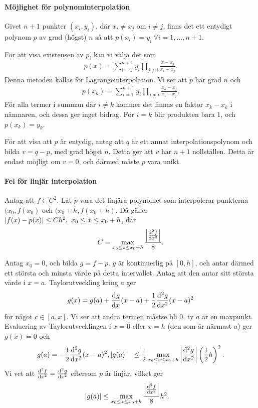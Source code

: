 \paragraph{Möjlighet för polynominterpolation}
Givet $n + 1$ punkter $(x_{i}, y_{i})$, där $x_{i}\neq x_{j}$ om $i\neq j$, finns det ett entydigt polynom $p$ av grad (högst) $n$ så att $p(x_{i}) = y_{i}\ \forall i= 1, \dots, n + 1$.

\proof
För att visa existensen av $p$, kan vi välja det som
\begin{align*}
	p(x) = \sum\limits_{i = 1}^{n + 1}y_{i}\prod\limits_{j\neq i}\frac{x - x_{j}}{x_{i} - x_{j}}.
\end{align*}
Denna metoden kallas för Lagrangeinterpolation. Vi ser att $p$ har grad $n$ och
\begin{align*}
	p(x_{k}) = \sum\limits_{i = 1}^{n + 1}y_{i}\prod\limits_{j\neq i}\frac{x_{k} - x_{j}}{x_{i} - x_{j}}.
\end{align*}
För alla termer i summan där $i\neq k$ kommer det finnas en faktor $x_{k} - x_{k}$ i nämnaren, och dessa ger inget bidrag. För $i = k$ blir produkten bara $1$, och $p(x_{k}) = y_{k}$.

För att visa att $p$ är entydig, antag att $q$ är ett annat interpolationspolynom och bilda $v = q - p$, med grad högst $n$. Detta ger att $v$ har $n + 1$ nollställen. Detta är endast möjligt om $v = 0$, och därmed måste $p$ vara unikt.

\paragraph{Fel för linjär interpolation}
Antag att $f\in C^{2}$. Låt $p$ vara det linjära polynomet som interpolerar punkterna $(x_{0}, f(x_{0})$ och $(x_{0} + h, f(x_{0} + h)$. Då gäller $\abs{f(x) - p(x)} \leq Ch^{2},\ x_{0} \leq x \leq x_{0} + h$, där
\begin{align*}
	C = \max\limits_{x_{0} \leq z \leq x_{0} + h}\frac{\abs{\dv[2]{f}{x} (z)}}{8}.
\end{align*}

\proof
Antag $x_{0} = 0$, och bilda $g = f - p$. $g$ är kontinuerlig på $[0, h]$, och antar därmed ett största och minsta värde på detta intervallet. Antag att den antar sitt största värde i $x = a$. Taylorutveckling kring $a$ ger
\begin{align*}
	g(x) = g(a) + \dv[]{g}{x} (a)(x - a) + \frac{1}{2}\dv[2]{g}{x} (c)(x - a)^{2}
\end{align*}
för något $c\in [a, x]$. Vi ser att andra termen måstse bli $0$, ty $a$ är en maxpunkt. Evaluering av Taylorutvecklingen i $x = 0$ eller $x = h$ (den som är närmast $a$) ger $g(x) = 0$ och
\begin{align*}
	g(a)       &= -\frac{1}{2}\dv[2]{g}{x} (c)(x - a)^{2},
	\abs{g(a)} &\leq \frac{1}{2}\max\limits_{x_{0} \leq z \leq x_{0} + h}\abs{\dv[2]{g}{x} (z)}\left(\frac{1}{2}h\right)^{2}.
\end{align*}
Vi vet att $\dv[2]{f}{x} (x) = \dv[2]{g}{x} (x)$ eftersom $p$ är linjär, vilket ger
\begin{align*}
	\abs{g(a)} &\leq \max\limits_{x_{0} \leq z \leq x_{0} + h}\frac{\abs{\dv[2]{f}{x} (z)}}{8}h^{2}.
\end{align*}